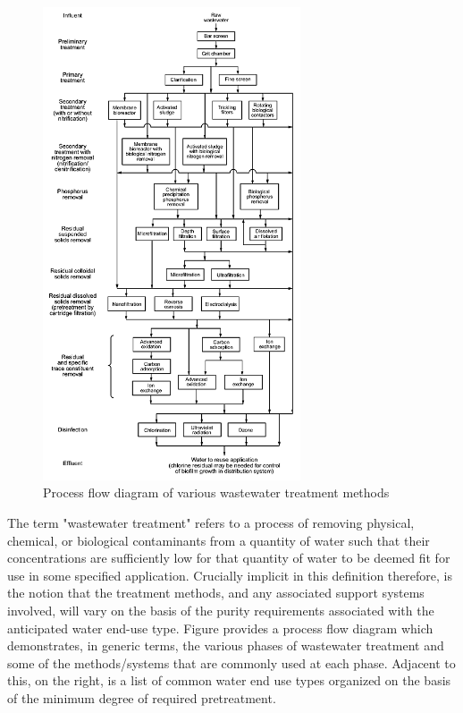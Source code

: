      \begin{figure}[Process flow diagram of various wastewater treatment methods]
       \centering
       \includegraphics[width=3in]{figures/process-flow.png}
       \caption[Process Flow Diagram of Wastewater Treatment Methods]{Process flow diagram of various wastewater treatment methods}
       \label{fig:process-flow-diagram}
     \end{figure}
    
The term "wastewater treatment" refers to a process of removing physical, chemical, or biological contaminants from a quantity of water such that their concentrations are sufficiently low for that quantity of water to be deemed fit for use in some specified application. Crucially implicit in this definition therefore, is the notion that the treatment methods, and any associated support systems involved, will vary on the basis of the purity requirements associated with the anticipated water end-use type. Figure provides a process flow diagram which demonstrates, in generic terms, the various phases of wastewater treatment and some of the methods/systems that are commonly used at each phase. Adjacent to this, on the right, is a list of common water end use types organized on the basis of the minimum degree of required pretreatment.
    
